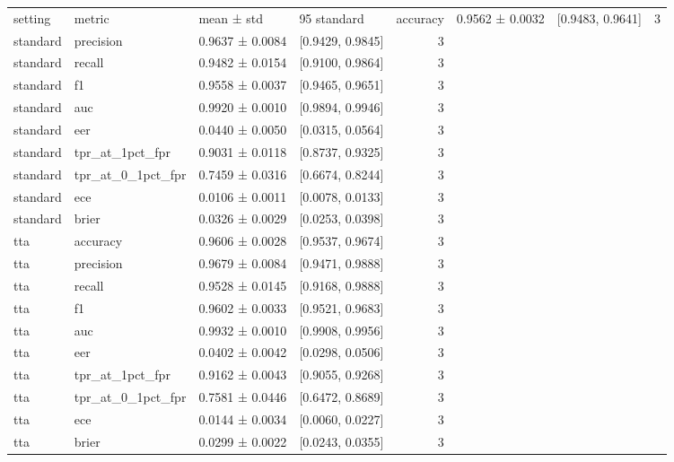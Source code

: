 \begin{tabular}{llllr}
\toprule
setting & metric & mean ± std & 95%
\midrule
standard & accuracy & 0.9562 ± 0.0032 & [0.9483, 0.9641] & 3 \\
standard & precision & 0.9637 ± 0.0084 & [0.9429, 0.9845] & 3 \\
standard & recall & 0.9482 ± 0.0154 & [0.9100, 0.9864] & 3 \\
standard & f1 & 0.9558 ± 0.0037 & [0.9465, 0.9651] & 3 \\
standard & auc & 0.9920 ± 0.0010 & [0.9894, 0.9946] & 3 \\
standard & eer & 0.0440 ± 0.0050 & [0.0315, 0.0564] & 3 \\
standard & tpr_at_1pct_fpr & 0.9031 ± 0.0118 & [0.8737, 0.9325] & 3 \\
standard & tpr_at_0_1pct_fpr & 0.7459 ± 0.0316 & [0.6674, 0.8244] & 3 \\
standard & ece & 0.0106 ± 0.0011 & [0.0078, 0.0133] & 3 \\
standard & brier & 0.0326 ± 0.0029 & [0.0253, 0.0398] & 3 \\
tta & accuracy & 0.9606 ± 0.0028 & [0.9537, 0.9674] & 3 \\
tta & precision & 0.9679 ± 0.0084 & [0.9471, 0.9888] & 3 \\
tta & recall & 0.9528 ± 0.0145 & [0.9168, 0.9888] & 3 \\
tta & f1 & 0.9602 ± 0.0033 & [0.9521, 0.9683] & 3 \\
tta & auc & 0.9932 ± 0.0010 & [0.9908, 0.9956] & 3 \\
tta & eer & 0.0402 ± 0.0042 & [0.0298, 0.0506] & 3 \\
tta & tpr_at_1pct_fpr & 0.9162 ± 0.0043 & [0.9055, 0.9268] & 3 \\
tta & tpr_at_0_1pct_fpr & 0.7581 ± 0.0446 & [0.6472, 0.8689] & 3 \\
tta & ece & 0.0144 ± 0.0034 & [0.0060, 0.0227] & 3 \\
tta & brier & 0.0299 ± 0.0022 & [0.0243, 0.0355] & 3 \\
\bottomrule
\end{tabular}
